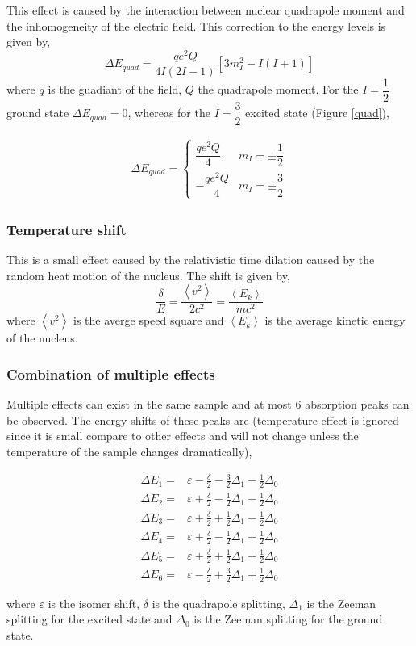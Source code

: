 \documentclass[aps,twocolumn,secnumarabic,balancelastpage,amsmath,amssymb,nofootinbib]{revtex4}
\newcommand{\eqar}[1]
{
  \begin{align*}
    #1
  \end{align*}
}
\newcommand{\sqr}[1]{{\left[{#1}\right]}}
\newcommand{\angl}[1]{{\left\langle{#1}\right\rangle}}
\begin{document}
This effect is caused by the interaction between nuclear quadrapole moment and the inhomogeneity of the electric field. This correction to the energy levels is given by,
\[\Delta E_{quad}=\frac{qe^2Q}{4I(2I-1)}\sqr{3m_I^2-I(I+1)}\]
where $q$ is the guadiant of the field, $Q$ the quadrapole moment. For the $I=\dfrac12$ ground state $\Delta E_{quad}=0$, whereas for the $I=\dfrac32$ excited state (Figure \ref{quad}),
\eqar{
  \Delta E_{quad}=\left\{\begin{array}{ll}
      \dfrac{qe^2Q}{4}&m_I=\pm\dfrac12\\
      -\dfrac{qe^2Q}{4}&m_I=\pm\dfrac32
    \end{array}
  \right.
}
\subsubsection{Temperature shift}
This is a small effect caused by the relativistic time dilation caused by the random heat motion of the nucleus. The shift is given by,
\[\frac{\delta}{E}=\frac{\angl{v^2}}{2c^2}=\frac{\angl{E_k}}{mc^2}\]
where $\angl{v^2}$ is the averge speed square and $\angl{E_k}$ is the average kinetic energy of the nucleus.

\subsubsection{Combination of multiple effects}
Multiple effects can exist in the same sample and at most $6$ absorption peaks can be observed. The energy shifts of these peaks are (temperature effect is ignored since it is small compare to other effects and will not change unless the temperature of the sample changes dramatically),
\eqar{
  \Delta E_1=&\varepsilon-\frac\delta2-\frac32\Delta_1-\frac12\Delta_0\\
  \Delta E_2=&\varepsilon+\frac\delta2-\frac12\Delta_1-\frac12\Delta_0\\
  \Delta E_3=&\varepsilon+\frac\delta2+\frac12\Delta_1-\frac12\Delta_0\\
  \Delta E_4=&\varepsilon+\frac\delta2-\frac12\Delta_1+\frac12\Delta_0\\
  \Delta E_5=&\varepsilon+\frac\delta2+\frac12\Delta_1+\frac12\Delta_0\\
  \Delta E_6=&\varepsilon-\frac\delta2+\frac32\Delta_1+\frac12\Delta_0
}
where $\varepsilon$ is the isomer shift, $\delta$ is the quadrapole splitting, $\Delta_1$ is the Zeeman splitting for the excited state and $\Delta_0$ is the Zeeman splitting for the ground state.
\end{document}
